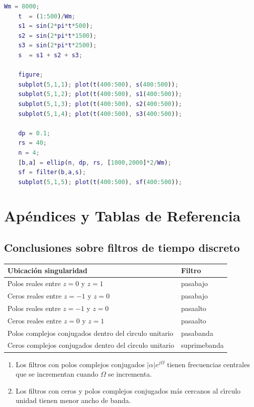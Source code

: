 \documentclass[11pt,a4paper,openany]{book}
\begin{document}
\begin{lstlisting}[language=Matlab]
	Wm = 8000;
	t  = (1:500)/Wm;
	s1 = sin(2*pi*t*500);
	s2 = sin(2*pi*t*1500);
	s3 = sin(2*pi*t*2500);
	s  = s1 + s2 + s3;
	
	figure;
	subplot(5,1,1); plot(t(400:500), s(400:500));
	subplot(5,1,2); plot(t(400:500), s1(400:500));
	subplot(5,1,3); plot(t(400:500), s2(400:500));
	subplot(5,1,4); plot(t(400:500), s3(400:500));
	
	dp = 0.1;
	rs = 40;
	n = 4;
	[b,a] = ellip(n, dp, rs, [1000,2000]*2/Wm);
	sf = filter(b,a,s);
	subplot(5,1,5); plot(t(400:500), sf(400:500));
\end{lstlisting}


\chapter{Ap\'{e}ndices y Tablas de Referencia}

\section{Conclusiones sobre filtros de tiempo discreto}

\begin{center}
	\renewcommand{\arraystretch}{1.3}
	\begin{tabular}{ll}
		\textbf{Ubicaci\'{o}n singularidad}                             & \textbf{Filtro}               \\ \hline
		Polos reales entre $z=0$ y $z=1$                                & pasabajo                      \\ 
		Ceros reales entre $z=-1$ y $z=0$                               & pasabajo                      \\ 
		Polos reales entre $z=-1$ y $z=0$                               & pasaalto                      \\ 
		Ceros reales entre $z=0$ y $z=1$                                & pasaalto                      \\ 
		Polos complejos conjugados dentro del c\'{\i}rculo unitario     & pasabanda                     \\ 
		Ceros complejos conjugados dentro del c\'{\i}rculo unitario     & suprimebanda 
	\end{tabular}
\end{center}

\begin{enumerate}
	\item Los filtros con polos complejos conjugados $\left| \alpha \right| e^{j\Omega }$ tienen frecuencias centrales que se incrementan cuando $\Omega $ se incrementa.
	\item Los filtros con ceros y polos complejos conjugados m\'{a}s cercanos al c\'{\i}rculo unidad tienen menor ancho de banda.
\end{enumerate}
\end{document}
